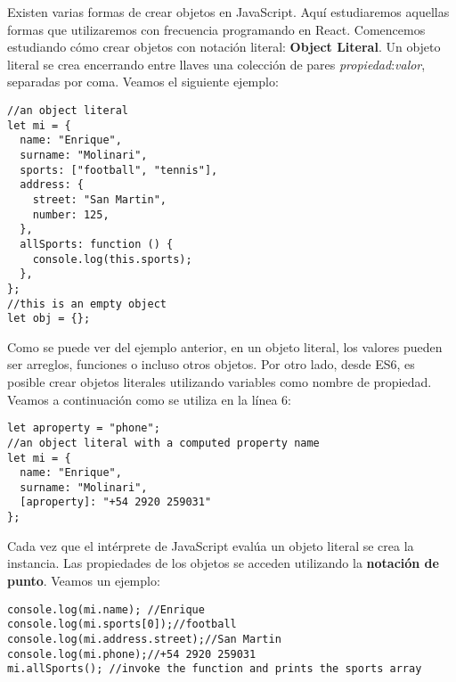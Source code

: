 \documentclass[a4paper, oneside, titlepage, 12pt]{paper}
\begin{document}
Existen varias formas de crear objetos en JavaScript. Aquí estudiaremos aquellas formas que utilizaremos con frecuencia programando en React. Comencemos estudiando cómo crear objetos con notación literal: \textbf{Object Literal}. Un objeto literal se crea encerrando entre llaves una colección de pares \textit{propiedad}:\textit{valor}, separadas por coma. Veamos el siguiente ejemplo: 

\begin{verbatim}
//an object literal
let mi = {
  name: "Enrique",
  surname: "Molinari",
  sports: ["football", "tennis"],
  address: {
    street: "San Martin",
    number: 125,
  },
  allSports: function () {
    console.log(this.sports);
  },
};
//this is an empty object
let obj = {};
\end{verbatim}

Como se puede ver del ejemplo anterior, en un objeto literal, los valores pueden ser arreglos, funciones o incluso otros objetos. Por otro lado, desde ES6, es posible crear objetos literales utilizando variables como nombre de propiedad. Veamos a continuación como se utiliza en la línea 6: 

\begin{verbatim}
let aproperty = "phone";               
//an object literal with a computed property name 
let mi = {
  name: "Enrique",
  surname: "Molinari",
  [aproperty]: "+54 2920 259031"
};

\end{verbatim}

Cada vez que el intérprete de JavaScript evalúa un objeto literal se crea la instancia. Las propiedades de los objetos se acceden utilizando la \textbf{notación de punto}. Veamos un ejemplo:

\begin{verbatim}
console.log(mi.name); //Enrique
console.log(mi.sports[0]);//football
console.log(mi.address.street);//San Martin
console.log(mi.phone);//+54 2920 259031
mi.allSports(); //invoke the function and prints the sports array               
\end{verbatim}
\end{document}
